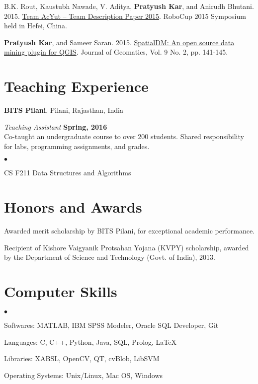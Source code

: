 \documentclass[margin,line]{res}
\newenvironment{list2}{
  \begin{list}{$\bullet$}{%
      \setlength{\itemsep}{0in}
      \setlength{\parsep}{0in} \setlength{\parskip}{0in}
      \setlength{\topsep}{0in} \setlength{\partopsep}{0in} 
      \setlength{\leftmargin}{0.2in}}}{\end{list}}
\begin{document}
\begin{resume}
B.K. Rout, Kaustubh Nawade, V. Aditya, {\bf Pratyush Kar}, and Anirudh Bhutani. 2015. \href{https://sites.google.com/site/pratyushkar/publications/Team\%20AcYut\%20\%E2\%80\%93\%20Team\%20Description\%20Paper\%202015.pdf?attredirects=0&d=0}{Team AcYut -- Team Description Paper 2015}. RoboCup 2015 Symposium held in Hefei, China.

{\bf Pratyush Kar}, and Sameer Saran. 2015. \href{https://sites.google.com/site/pratyushkar/publications/SpatialDM.pdf?attredirects=0&d=0}{SpatialDM: An open source data mining plugin for QGIS}. Journal of Geomatics, Vol. 9 No. 2, pp. 141-145.

\section{\sc Teaching Experience}
{\bf BITS Pilani}, Pilani, Rajasthan, India

\vspace{-.3cm}
{\em Teaching Assistant} \hfill {\bf Spring, 2016}\\
Co-taught an undergraduate course to over 200 students.  Shared responsibility for labs, programming assignments, and grades.
\vspace*{.05in}  
\begin{list2}
\item CS F211 Data Structures and Algorithms
\end{list2}


\section{\sc Honors and Awards}

Awarded merit scholarship by BITS Pilani, for exceptional academic performance.

\vspace*{-2.5mm}
Recipient of Kishore Vaigyanik Protsahan Yojana (KVPY) scholarship, awarded by the Department of Science and Technology (Govt. of India), 2013.


\section{\sc Computer Skills} 
\begin{list2}
\item Softwares: MATLAB, IBM SPSS Modeler, Oracle SQL Developer, Git
\item Languages:  C, C++, Python, Java, SQL, Prolog, \LaTeX
\item Libraries: XABSL, OpenCV, QT, cvBlob, LibSVM
\item Operating Systems:  Unix/Linux, Mac OS, Windows\\ 
\end{list2}



\end{resume}
\end{document}
